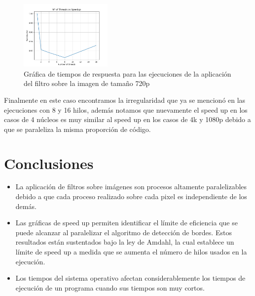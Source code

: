 \begin{figure}[H]
    \centering
    \includegraphics[width=0.4\textwidth]{../plots/720p_speedup.png}
    \caption{Gráfica de tiempos de respuesta para las ejecuciones de la aplicación del filtro sobre la imagen de tamaño 720p}
\end{figure}

Finalmente en este caso encontramos la irregularidad que ya se mencionó en las ejecuciones con 8 y 16 hilos, además notamos que nuevamente el speed up en los casos de 4 núcleos es muy similar al speed up en los casos de 4k y 1080p debido a que se paraleliza la misma proporción de código.

\section{Conclusiones}

\begin{itemize}
    \item La aplicación de filtros sobre imágenes son procesos altamente paralelizables debido a que cada proceso realizado sobre cada pixel es independiente de los demás.
    \item Las gráficas de speed up permiten identificar el límite de eficiencia que se puede alcanzar al paralelizar el algoritmo de detección de bordes. Estos resultados están sustentados bajo la ley de Amdahl, la cual establece un límite de speed up a medida que se aumenta el número de hilos usados en la ejecución.
    \item Los tiempos del sistema operativo afectan considerablemente los tiempos de ejecución de un programa cuando sus tiempos son muy cortos.
\end{itemize}


